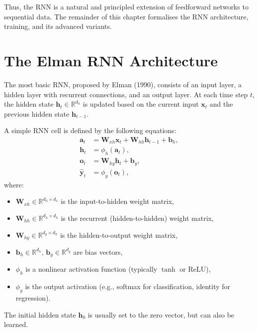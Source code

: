 \documentclass{tufte-handout}
\begin{document}
Thus, the RNN is a natural and principled extension of feedforward networks to sequential data. The remainder of this chapter formalises the RNN architecture, training, and its advanced variants.

\section{The Elman RNN Architecture}

The most basic RNN, proposed by Elman (1990), consists of an input layer, a hidden layer with recurrent connections, and an output layer. At each time step $t$, the hidden state $\mathbf{h}_t \in \mathbb{R}^{d_h}$ is updated based on the current input $\mathbf{x}_t$ and the previous hidden state $\mathbf{h}_{t-1}$.

\begin{defn}
    A simple RNN cell is defined by the following equations:
    \begin{align}
        \mathbf{a}_t &= \mathbf{W}_{xh} \mathbf{x}_t + \mathbf{W}_{hh} \mathbf{h}_{t-1} + \mathbf{b}_h, \label{eq:rnn_pre} \\
        \mathbf{h}_t &= \phi_h(\mathbf{a}_t), \label{eq:rnn_hidden} \\
        \mathbf{o}_t &= \mathbf{W}_{hy} \mathbf{h}_t + \mathbf{b}_y, \label{eq:rnn_output} \\
        \hat{\mathbf{y}}_t &= \phi_y(\mathbf{o}_t), \label{eq:rnn_pred}
    \end{align}
    where:
    \begin{itemize}
        \item $\mathbf{W}_{xh} \in \mathbb{R}^{d_h \times d_x}$ is the input-to-hidden weight matrix,
        \item $\mathbf{W}_{hh} \in \mathbb{R}^{d_h \times d_h}$ is the recurrent (hidden-to-hidden) weight matrix,
        \item $\mathbf{W}_{hy} \in \mathbb{R}^{d_y \times d_h}$ is the hidden-to-output weight matrix,
        \item $\mathbf{b}_h \in \mathbb{R}^{d_h}$, $\mathbf{b}_y \in \mathbb{R}^{d_y}$ are bias vectors,
        \item $\phi_h$ is a nonlinear activation function (typically $\tanh$ or ReLU),
        \item $\phi_y$ is the output activation (e.g., softmax for classification, identity for regression).
    \end{itemize}
    The initial hidden state $\mathbf{h}_0$ is usually set to the zero vector, but can also be learned.
\end{defn}
\end{document}
